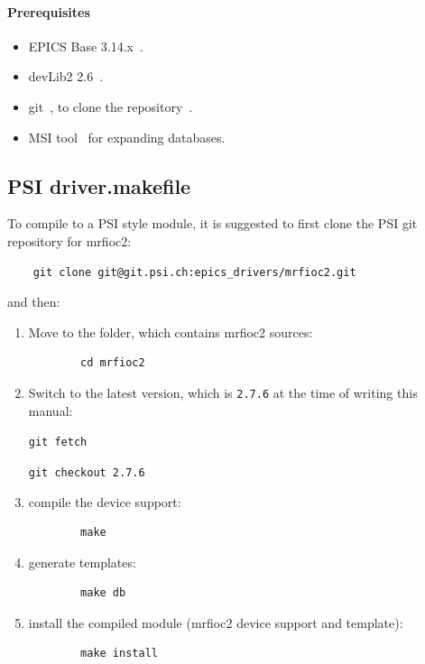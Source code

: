\documentclass[12pt,a4paper]{article}
\newcommand{\latestDriverVersion}{2.7.6}
\begin{document}
\paragraph{Prerequisites}
\begin{itemize}
\item 
	EPICS Base 3.14.x~\cite{epics}.
\item 
	devLib2 2.6~\cite{devlib2}.
\item
	git~\cite{git}, to clone the repository~\cite{git_mrfioc2}.
\item 
	MSI tool~\cite{msi} for expanding databases.
\end{itemize}

\subsection{PSI driver.makefile}\label{sec:PSI driver.makefile}
To compile to a PSI style module, it is suggested to first clone the PSI git repository for mrfioc2:
\begin{verbatim}
	git clone git@git.psi.ch:epics_drivers/mrfioc2.git
\end{verbatim}
and then:
\begin{enumerate}
\item
	Move to the folder, which contains mrfioc2 sources:
	\begin{verbatim}
		cd mrfioc2
	\end{verbatim}
	
\item 
	Switch to the latest version, which is \texttt{\latestDriverVersion} at the time of writing this manual:
	
	\texttt{git fetch}
	
	\texttt{git checkout \latestDriverVersion}
	
\item
	compile the device support:
	\begin{verbatim}
		make
	\end{verbatim}

\item 
	generate templates:
	\begin{verbatim}
		make db
	\end{verbatim}

\item 
	install the compiled module (mrfioc2 device support and template):
	\begin{verbatim}
		make install
	\end{verbatim}
\end{enumerate}
\end{document}
